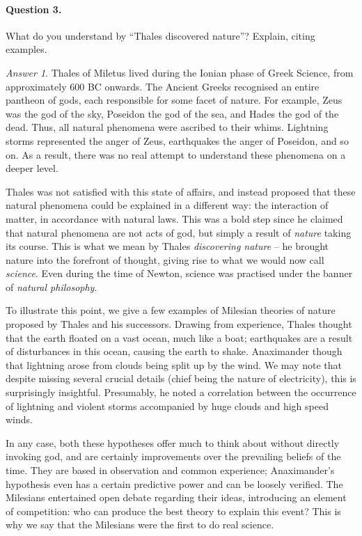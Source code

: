 \documentclass[11pt]{article}
\theoremstyle{remark}
\newtheorem*{answer}{Answer}
\begin{document}
    \paragraph{Question 3.} What do you understand by ``Thales discovered nature''?
    Explain, citing examples.
    \begin{answer}
        Thales of Miletus lived during the Ionian phase of Greek Science, from
        approximately 600 BC onwards. The Ancient Greeks recognised an entire
        pantheon of gods, each responsible for some facet of nature. For example,
        Zeus was the god of the sky, Poseidon the god of the sea, and Hades the god
        of the dead. Thus, all natural phenomena were ascribed to their whims.
        Lightning storms represented the anger of Zeus, earthquakes the anger of
        Poseidon, and so on. As a result, there was no real attempt to understand
        these phenomena on a deeper level.

        Thales was not satisfied with this state of affairs, and instead proposed
        that these natural phenomena could be explained in a different way: the
        interaction of matter, in accordance with natural laws. This was a bold step
        since he claimed that natural phenomena are not acts of god, but simply a
        result of \emph{nature} taking its course. This is what we mean by Thales
        \emph{discovering  nature} -- he brought nature into the forefront of
        thought, giving rise to what we would now call \emph{science}. Even during
        the time of Newton, science was practised under the banner of \emph{natural
        philosophy}.

        To illustrate this point, we give a few examples of Milesian theories of
        nature proposed by Thales and his successors. Drawing from experience,
        Thales thought that the earth floated on a vast ocean, much like a boat;
        earthquakes are a result of disturbances in this ocean, causing the earth to
        shake. Anaximander though that lightning arose from clouds being split up by
        the wind. We may note that despite missing several crucial details (chief
        being the nature of electricity), this is surprisingly insightful.
        Presumably, he noted a correlation between the occurrence of lightning and
        violent storms accompanied by huge clouds and high speed winds.

        In any case, both these hypotheses offer much to think about without directly
        invoking god, and are certainly improvements over the prevailing beliefs of
        the time. They are based in observation and common experience; Anaximander's
        hypothesis even has a certain predictive power and can be loosely verified.
        The Milesians entertained open debate regarding their ideas, introducing an
        element of competition: who can produce the best theory to explain this
        event? This is why we say that the Milesians were the first to do real
        science.
    \end{answer}
\end{document}
